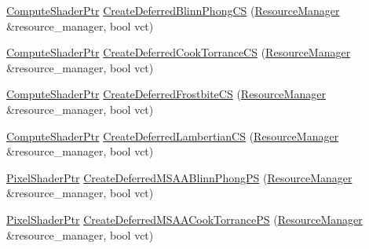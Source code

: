 \begin{DoxyCompactItemize}
\item 
\mbox{\hyperlink{namespacemage_1_1rendering_ab3dc9f2114f2e9255b91d9c051da52ea}{Compute\+Shader\+Ptr}} \mbox{\hyperlink{namespacemage_1_1rendering_1_1anonymous__namespace_02shader__factory__deferred_8cpp_03_ac5adb06d03d8eaedce14d99601702fe7}{Create\+Deferred\+Blinn\+Phong\+CS}} (\mbox{\hyperlink{classmage_1_1rendering_1_1_resource_manager}{Resource\+Manager}} \&resource\+\_\+manager, bool vct)
\item 
\mbox{\hyperlink{namespacemage_1_1rendering_ab3dc9f2114f2e9255b91d9c051da52ea}{Compute\+Shader\+Ptr}} \mbox{\hyperlink{namespacemage_1_1rendering_1_1anonymous__namespace_02shader__factory__deferred_8cpp_03_a2bd61203935ebc99d11f396914189d91}{Create\+Deferred\+Cook\+Torrance\+CS}} (\mbox{\hyperlink{classmage_1_1rendering_1_1_resource_manager}{Resource\+Manager}} \&resource\+\_\+manager, bool vct)
\item 
\mbox{\hyperlink{namespacemage_1_1rendering_ab3dc9f2114f2e9255b91d9c051da52ea}{Compute\+Shader\+Ptr}} \mbox{\hyperlink{namespacemage_1_1rendering_1_1anonymous__namespace_02shader__factory__deferred_8cpp_03_a52db8ec13dd426a7ee8cfd959990271c}{Create\+Deferred\+Frostbite\+CS}} (\mbox{\hyperlink{classmage_1_1rendering_1_1_resource_manager}{Resource\+Manager}} \&resource\+\_\+manager, bool vct)
\item 
\mbox{\hyperlink{namespacemage_1_1rendering_ab3dc9f2114f2e9255b91d9c051da52ea}{Compute\+Shader\+Ptr}} \mbox{\hyperlink{namespacemage_1_1rendering_1_1anonymous__namespace_02shader__factory__deferred_8cpp_03_a0ee99c5705465b819bfc92c623d4e09f}{Create\+Deferred\+Lambertian\+CS}} (\mbox{\hyperlink{classmage_1_1rendering_1_1_resource_manager}{Resource\+Manager}} \&resource\+\_\+manager, bool vct)
\item 
\mbox{\hyperlink{namespacemage_1_1rendering_af03d922b228ee9c8542baaa2ecc9f259}{Pixel\+Shader\+Ptr}} \mbox{\hyperlink{namespacemage_1_1rendering_1_1anonymous__namespace_02shader__factory__deferred_8cpp_03_aeb2ee591f6ee093a67c2d0b2449e43cc}{Create\+Deferred\+M\+S\+A\+A\+Blinn\+Phong\+PS}} (\mbox{\hyperlink{classmage_1_1rendering_1_1_resource_manager}{Resource\+Manager}} \&resource\+\_\+manager, bool vct)
\item 
\mbox{\hyperlink{namespacemage_1_1rendering_af03d922b228ee9c8542baaa2ecc9f259}{Pixel\+Shader\+Ptr}} \mbox{\hyperlink{namespacemage_1_1rendering_1_1anonymous__namespace_02shader__factory__deferred_8cpp_03_a6aecd672a46b1d168aec9267dfc7b0bc}{Create\+Deferred\+M\+S\+A\+A\+Cook\+Torrance\+PS}} (\mbox{\hyperlink{classmage_1_1rendering_1_1_resource_manager}{Resource\+Manager}} \&resource\+\_\+manager, bool vct)

\end{DoxyCompactItemize}
